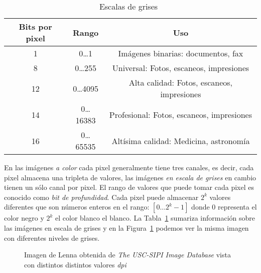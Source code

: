 \begin{table}
  \caption[Escala de grises]{Escalas de grises~\cite{burger2008digital}} 
  \label{table:grayscales}
\begin{center}
{\small
    \begin{tabular}{c|c|c}
    \hline
    {\bf Bits por pixel} & 
    {\bf Rango} & 
    {\bf Uso} \\
    \hline
    1  & 0\dots1     & Imágenes binarias: documentos, fax \\
    8  & 0\dots255   & Universal: Fotos, escaneos, impresiones   \\
    12 & 0\dots4095  & Alta calidad: Fotos, escaneos, impresiones   \\
    14 & 0\dots16383 & Profesional: Fotos, escaneos, impresiones   \\
    16 & 0\dots65535 & Altísima calidad: Medicina, astronomía   \\
    \hline
    \end{tabular}
}
\end{center}
\end{table}

En las imágenes \textit{a color} cada pixel generalmente tiene tres canales, es
decir, cada pixel almacena una tripleta de valores, las imágenes \textit{en
escala de grises} en cambio tienen un sólo canal por pixel. El rango de valores
que puede tomar cada pixel es conocido como \textit{bit de profundidad}. Cada
pixel puede almacenar $2^k$ valores diferentes que son números enteros en el
rango: $[0\dots2^k - 1]$ donde $0$ representa el color negro y $2^k$ el color
blanco el blanco. La Tabla~\ref{table:grayscales} sumariza información sobre
las imágenes en escala de grises y en la Figura~\ref{grayscales} podemos ver la
misma imagen con diferentes niveles de grises.

\begin{figure}[h]
    \centering



  \caption[Niveles de grises]{Imagen de Lenna obtenida de \textit{The USC-SIPI Image Database}
  vista con distintos distintos valores \textit{dpi}}
  
  \label{grayscales}
\end{figure}

